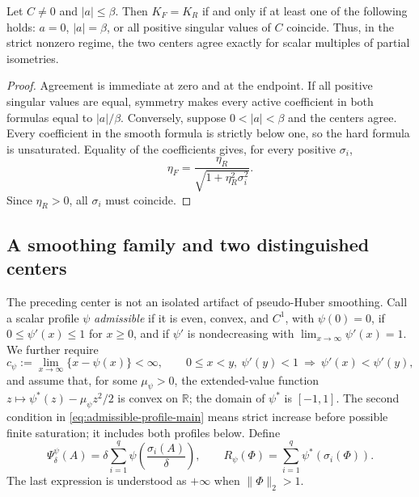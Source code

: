 \begin{corollary}
\label{cor:center-agreement-main}
Let \(C\ne0\) and \(|a|\le\beta\).  Then \(K_F=K_R\) if and only if at least
one of the following holds: \(a=0\), \(|a|=\beta\), or all positive singular
values of \(C\) coincide.  Thus, in the strict nonzero regime, the two centers
agree exactly for scalar multiples of partial isometries.
\end{corollary}

\begin{proof}
Agreement is immediate at zero and at the endpoint.  If all positive singular
values are equal, symmetry makes every active coefficient in both formulas
equal to \(|a|/\beta\).  Conversely, suppose
\(0<|a|<\beta\) and the centers agree.  Every coefficient in the smooth
formula is strictly below one, so the hard formula is unsaturated.  Equality
of the coefficients gives, for every positive \(\sigma_i\),
\[
 \eta_F=\frac{\eta_R}{\sqrt{1+\eta_R^2\sigma_i^2}}.
\]
Since \(\eta_R>0\), all \(\sigma_i\) must coincide.
\end{proof}

\subsection{A smoothing family and two distinguished centers}

The preceding center is not an isolated artifact of pseudo-Huber smoothing.
Call a scalar profile \(\psi\) \emph{admissible} if it is even, convex, and
\(C^1\), with \(\psi(0)=0\), if \(0\le\psi'(x)\le1\) for \(x\ge0\), and if
\(\psi'\) is nondecreasing with \(\lim_{x\to\infty}\psi'(x)=1\).  We further require
\[
 c_\psi:=\lim_{x\to\infty}\{x-\psi(x)\}<\infty,
 \qquad
 0\le x<y,\ \psi'(y)<1\ \Longrightarrow\ \psi'(x)<\psi'(y),
 \tag{A}
 \label{eq:admissible-profile-main}
\]
and assume that, for some \(\mu_\psi>0\), the extended-value function
\(z\mapsto\psi^*(z)-\mu_\psi z^2/2\) is convex on \(\mathbb R\); the domain
of \(\psi^*\) is \([-1,1]\).  The second condition in
\eqref{eq:admissible-profile-main} means strict increase before possible
finite saturation; it includes both profiles below.  Define
\begin{equation}
 \Psi_\delta^\psi(A)=\delta\sum_{i=1}^q
 \psi\!\left(\frac{\sigma_i(A)}{\delta}\right),
 \qquad
 R_\psi(\Phi)=\sum_{i=1}^q\psi^*(\sigma_i(\Phi)).
 \label{eq:profile-lifts-main}
\end{equation}
The last expression is understood as \(+\infty\) when
\(\|\Phi\|_2>1\).

